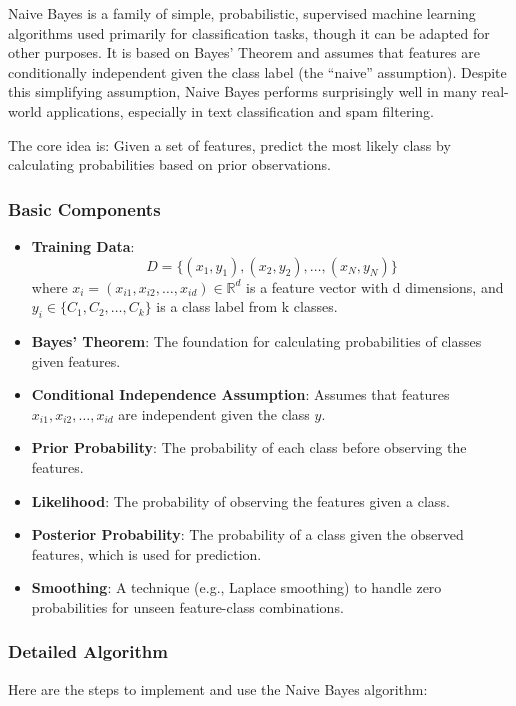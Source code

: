Naive Bayes is a family of simple, probabilistic, supervised machine learning algorithms used primarily for classification tasks, though it can be adapted for other purposes.
It is based on Bayes’ Theorem and assumes that features are conditionally independent given the class label (the ``naive'' assumption).
Despite this simplifying assumption, Naive Bayes performs surprisingly well in many real-world applications, especially in text classification and spam filtering.

The core idea is: Given a set of features, predict the most likely class by calculating probabilities based on prior observations.

\subsubsection{Basic Components}

\begin{itemize}
    \item \textbf{Training Data}:
        \[D = \{(x_1, y_1), (x_2, y_2), \dots, (x_N, y_N)\}\]
        where $x_i = (x_{i1}, x_{i2}, \dots, x_{id}) \in \mathbb{R}^d$ is a feature vector with d dimensions, and $y_i \in \{C_1, C_2, \dots, C_k\}$ is a class label from k classes.
    \item \textbf{Bayes' Theorem}: The foundation for calculating probabilities of classes given features.
    \item \textbf{Conditional Independence Assumption}: Assumes that features $x_{i1}, x_{i2}, \dots, x_{id}$ are independent given the class $y$.
    \item \textbf{Prior Probability}: The probability of each class before observing the features.
    \item \textbf{Likelihood}: The probability of observing the features given a class.
    \item \textbf{Posterior Probability}: The probability of a class given the observed features, which is used for prediction.
    \item \textbf{Smoothing}: A technique (e.g., Laplace smoothing) to handle zero probabilities for unseen feature-class combinations.
\end{itemize}

\subsubsection{Detailed Algorithm}

Here are the steps to implement and use the Naive Bayes algorithm:

